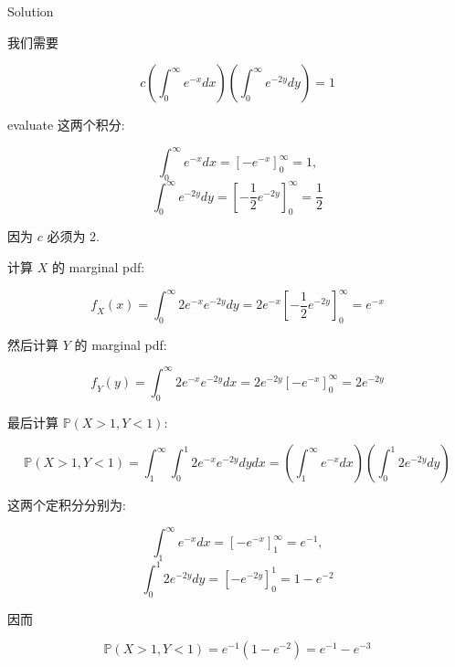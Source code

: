 \begin{qlsolution}{Solution}

我们需要

\[\mathit{c}\left( {\int_{0}^{\infty}\mathit{e}^{- \mathit{x}}\mathit{d}\mathit{x}} \right)\left( {\int_{0}^{\infty}\mathit{e}^{- 2\mathit{y}}\mathit{d}\mathit{y}} \right) = 1\]

evaluate 这两个积分:

\[\int_{0}^{\infty}\mathit{e}^{- \mathit{x}}\mathit{d}\mathit{x} = \left\lbrack {- \mathit{e}^{- \mathit{x}}} \right\rbrack_{0}^{\infty} = 1,\]\[\int_{0}^{\infty}\mathit{e}^{- 2\mathit{y}}\mathit{d}\mathit{y} = \left\lbrack {- \frac{1}{2}\mathit{e}^{- 2\mathit{y}}} \right\rbrack_{0}^{\infty} = \frac{1}{2}\]

因为 \(\mathit{c}\) 必须为 2.

计算 \(\mathit{X}\) 的 marginal pdf:

\[\mathit{f}_{\mathit{X}}(\mathit{x}) = \int_{0}^{\infty}2\mathit{e}^{- \mathit{x}}\mathit{e}^{- 2\mathit{y}}\mathit{d}\mathit{y} = 2\mathit{e}^{- \mathit{x}}\left\lbrack {- \frac{1}{2}\mathit{e}^{- 2\mathit{y}}} \right\rbrack_{0}^{\infty} = \mathit{e}^{- \mathit{x}}\]

然后计算 \(\mathit{Y}\) 的 marginal pdf:

\[\mathit{f}_{\mathit{Y}}(\mathit{y}) = \int_{0}^{\infty}2\mathit{e}^{- \mathit{x}}\mathit{e}^{- 2\mathit{y}}\mathit{d}\mathit{x} = 2\mathit{e}^{- 2\mathit{y}}\left\lbrack {- \mathit{e}^{- \mathit{x}}} \right\rbrack_{0}^{\infty} = 2\mathit{e}^{- 2\mathit{y}}\]

最后计算 \(\mathbb{P}(\mathit{X} > 1,\mathit{Y} < 1)\):

\[\mathbb{P}(\mathit{X} > 1,\mathit{Y} < 1) = \int_{1}^{\infty}\int_{0}^{1}2\mathit{e}^{- \mathit{x}}\mathit{e}^{- 2\mathit{y}}\mathit{d}\mathit{y}\mathit{d}\mathit{x} = \left( {\int_{1}^{\infty}\mathit{e}^{- \mathit{x}}\mathit{d}\mathit{x}} \right)\left( {\int_{0}^{1}2\mathit{e}^{- 2\mathit{y}}\mathit{d}\mathit{y}} \right)\]

这两个定积分分别为:

\[\int_{1}^{\infty}\mathit{e}^{- \mathit{x}}\mathit{d}\mathit{x} = \left\lbrack {- \mathit{e}^{- \mathit{x}}} \right\rbrack_{1}^{\infty} = \mathit{e}^{- 1},\]\[\int_{0}^{1}2\mathit{e}^{- 2\mathit{y}}\mathit{d}\mathit{y} = \left\lbrack {- \mathit{e}^{- 2\mathit{y}}} \right\rbrack_{0}^{1} = 1 - \mathit{e}^{- 2}\]

因而

\[\mathbb{P}(\mathit{X} > 1,\mathit{Y} < 1) = \mathit{e}^{- 1}(1 - \mathit{e}^{- 2}) = \mathit{e}^{- 1} - \mathit{e}^{- 3}\]

\end{qlsolution}

